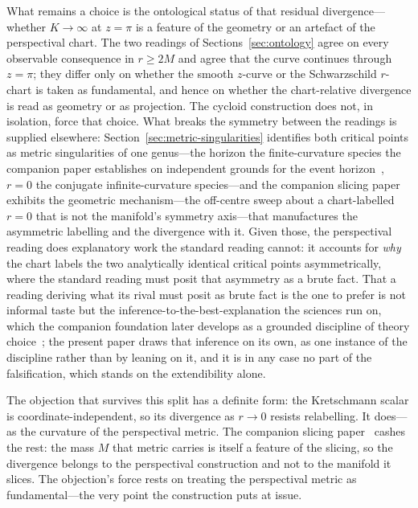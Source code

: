 \documentclass[11pt,a4paper]{article}
\theoremstyle{definition}
\begin{document}
What remains a choice is the ontological status of that residual divergence---whether $K \to \infty$ at $z=\pi$ is a feature of the geometry or an artefact of the perspectival chart. The two readings of Sections~\ref{sec:ontology} agree on every observable consequence in $r \geq 2M$ and agree that the curve continues through $z=\pi$; they differ only on whether the smooth $z$-curve or the Schwarzschild $r$-chart is taken as fundamental, and hence on whether the chart-relative divergence is read as geometry or as projection. The cycloid construction does not, in isolation, force that choice. What breaks the symmetry between the readings is supplied elsewhere: Section~\ref{sec:metric-singularities} identifies both critical points as metric singularities of one genus---the horizon the finite-curvature species the companion paper establishes on independent grounds for the event horizon~\cite{JanzenBHcausality}, $r=0$ the conjugate infinite-curvature species---and the companion slicing paper~\cite{JanzenSlicing} exhibits the geometric mechanism---the off-centre sweep about a chart-labelled $r=0$ that is not the manifold's symmetry axis---that manufactures the asymmetric labelling and the divergence with it. Given those, the perspectival reading does explanatory work the standard reading cannot: it accounts for \emph{why} the chart labels the two analytically identical critical points asymmetrically, where the standard reading must posit that asymmetry as a brute fact. That a reading deriving what its rival must posit as brute fact is the one to prefer is not informal taste but the inference-to-the-best-explanation the sciences run on, which the companion foundation later develops as a grounded discipline of theory choice~\cite{JanzenShadowExistence}; the present paper draws that inference on its own, as one instance of the discipline rather than by leaning on it, and it is in any case no part of the falsification, which stands on the extendibility alone.

The objection that survives this split has a definite form: the Kretschmann scalar is coordinate-independent, so its divergence as $r \to 0$ resists relabelling. It does---as the curvature of the perspectival metric. The companion slicing paper~\cite{JanzenSlicing} cashes the rest: the mass $M$ that metric carries is itself a feature of the slicing, so the divergence belongs to the perspectival construction and not to the manifold it slices. The objection's force rests on treating the perspectival metric as fundamental---the very point the construction puts at issue.
\end{document}
